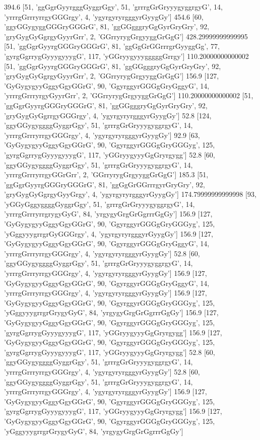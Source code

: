 394.6 [51, 'ggGgrGyyrgggGyggrGgy', 51, 'grrrgGrGryyygyggrgyG', 14, 'yrrrgGrrryrrgyGGGrgy', 4, 'ygyrgyryrgggyrGyygGy']
454.6 [60, 'ggyGGygyggGGGryGGGrG', 81, 'ggGGgggryGgGyrGryGry', 92, 'gryGygGyGgrgyGyyrGrr', 2, 'GGrryrygGrgyyggGrGgG']
428.29999999999995 [51, 'ggGgrGyyrgGGGryGGGrG', 81, 'ggGgGrGGrrrgrGyyggGg', 77, 'gyrgGgrrygGyyygyyygG', 117, 'yGGryygyyygggggGrrgy']
110.20000000000002 [51, 'ggGgrGyyrgGGGryGGGrG', 81, 'ggGGgggryGgGyrGryGry', 92, 'gryGygGyGgrgyGyyrGrr', 2, 'GGrryrygGrgyyggGrGgG']
156.9 [127, 'GyGygygyyGggyGgyGGrG', 90, 'GgyrggyrGGGgGryGggyG', 14, 'yrrrgGrrryrgyGyyrGrr', 2, 'GGrryrygGrgyyggGrGgG']
110.20000000000002 [51, 'ggGgrGyyrgGGGryGGGrG', 81, 'ggGGgggryGgGyrGryGry', 92, 'gryGygGyGgrrgyGGGrgy', 4, 'ygyrgyryrgggyrGyygGy']
52.8 [124, 'ggyGGygyggggGyggrGgy', 51, 'grrrgGrGryyygyggrgyG', 14, 'yrrrgGrrryrrgyGGGrgy', 4, 'ygyrgyryrgggyrGyygGy']
92.9 [63, 'GyGygygyyGggyGgyGGrG', 90, 'GgyrggyrGGGgGryGGGyg', 125, 'gyrgGgrrygGyyygyyygG', 117, 'yGGryygyyyGgGryrgygg']
52.8 [60, 'ggyGGygyggggGyggrGgy', 51, 'grrrgGrGryyygyggrgyG', 14, 'yrrrgGrrryrrgyGGrGrr', 2, 'GGrryrygGrgyyggGrGgG']
185.3 [51, 'ggGgrGyyrgGGGryGGGrG', 81, 'ggGgGrGGrrrgyrGryGry', 92, 'gryGygGyGgrgyGyyGrgy', 4, 'ygyrgyryrgggyrGyygGy']
174.79999999999998 [93, 'yGGyGggyggggGyggrGgy', 51, 'grrrgGrGryyygyggrgyG', 14, 'yrrrgGrrryrrgrygyGyG', 84, 'yrgygyGrgGrGgrrrGgGy']
156.9 [127, 'GyGygygyyGggyGgyGGrG', 90, 'GgyrggyrGGGgGryGGGyg', 125, 'yGggyyygrrgrGyGGGrgy', 4, 'ygyrgyryrgggyrGyygGy']
156.9 [127, 'GyGygygyyGggyGgyGGrG', 90, 'GgyrggyrGGGgGryGggyG', 14, 'yrrrgGrrryrrgyGGGrgy', 4, 'ygyrgyryrgggyrGyygGy']
52.8 [60, 'ggyGGygyggggGyggrGgy', 51, 'grrrgGrGryyygyggrgyG', 14, 'yrrrgGrrryrrgyGGGrgy', 4, 'ygyrgyryrgggyrGyygGy']
156.9 [127, 'GyGygygyyGggyGgyGGrG', 90, 'GgyrggyrGGGgGryGggyG', 14, 'yrrrgGrrryrrgyGGGrgy', 4, 'ygyrgyryrgggyrGyygGy']
156.9 [127, 'GyGygygyyGggyGgyGGrG', 90, 'GgyrggyrGGGgGryGGGyg', 125, 'yGggyyygrrgrGrygyGyG', 84, 'yrgygyGrgGrGgrrrGgGy']
156.9 [127, 'GyGygygyyGggyGgyGGrG', 90, 'GgyrggyrGGGgGryGGGyg', 125, 'gyrgGgrrygGyyygyyygG', 117, 'yGGryygyyyGgGryrgygg']
156.9 [127, 'GyGygygyyGggyGgyGGrG', 90, 'GgyrggyrGGGgGryGGGyg', 125, 'gyrgGgrrygGyyygyyygG', 117, 'yGGryygyyyGgGryrgygg']
52.8 [60, 'ggyGGygyggggGyggrGgy', 51, 'grrrgGrGryyygyggrgyG', 14, 'yrrrgGrrryrrgyGGGrgy', 4, 'ygyrgyryrgggyrGyygGy']
52.8 [60, 'ggyGGygyggggGyggrGgy', 51, 'grrrgGrGryyygyggrgyG', 14, 'yrrrgGrrryrrgyGGGrgy', 4, 'ygyrgyryrgggyrGyygGy']
156.9 [127, 'GyGygygyyGggyGgyGGrG', 90, 'GgyrggyrGGGgGryGGGyg', 125, 'gyrgGgrrygGyyygyyygG', 117, 'yGGryygyyyGgGryrgygg']
156.9 [127, 'GyGygygyyGggyGgyGGrG', 90, 'GgyrggyrGGGgGryGGGyg', 125, 'yGggyyygrrgrGrygyGyG', 84, 'yrgygyGrgGrGgrrrGgGy']
